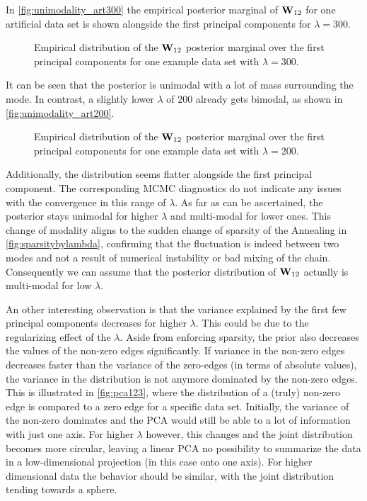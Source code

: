 In \autoref{fig:unimodality_art300}
the empirical posterior marginal of $\mathbf{W}_{12}$ for one artificial data set is shown alongside the first principal components for $\lambda=300$.
\begin{figure}[H]
	\centering
	\caption{Empirical distribution of the $\mathbf{W}_{12}$ posterior marginal over the first principal components for one example data set with $\lambda=300$.}
	
	\label{fig:unimodality_art300}
\end{figure}
It can be seen that the posterior is unimodal with a lot of mass surrounding the mode.
In contrast, a slightly lower $\lambda$ of $200$ already gets bimodal, as shown in \autoref{fig:unimodality_art200}.
\begin{figure}[H]
	\centering
	\caption{Empirical distribution of the $\mathbf{W}_{12}$ posterior marginal over the first principal components for one example data set with $\lambda=200$.}
	
	\label{fig:unimodality_art200}
\end{figure}
Additionally, the distribution seems flatter alongside the first principal component. 
The corresponding MCMC diagnostics do not indicate any issues with the convergence in this range of $\lambda$.
As far as can be ascertained, the posterior stays unimodal for higher $\lambda$ and multi-modal for lower ones.
This change of modality aligns to the sudden change of sparsity of the Annealing in \autoref{fig:sparsitybylambda},
confirming that the fluctuation is indeed between two modes and not a result of numerical instability or bad mixing of the chain.
Consequently we can assume that the posterior distribution of $\mathbf{W}_{12}$ actually is multi-modal for low $\lambda$.

An other interesting observation is that the variance explained by the first few principal components decreases for higher $\lambda$.
This could be due to the regularizing effect of the $\lambda$.
Aside from enforcing sparsity, the prior also decreases the values of the non-zero edges significantly.
If variance in the non-zero edges decreases faster than the variance of the zero-edges  (in terms of absolute values), the variance in the distribution is not anymore dominated by the non-zero edges.
This is illustrated in \autoref{fig:pca123}, where the distribution of a (truly) non-zero edge is compared to a zero edge
for a specific data set. 
Initially, the variance of the non-zero dominates and the PCA would still be able to a lot of information with just one axis. For higher $\lambda$ however, this changes and the joint distribution becomes more circular,
leaving a linear PCA no possibility to summarize the data in a low-dimensional projection (in this case onto one axis).
For higher dimensional data the behavior should be similar, with the joint distribution tending towards a sphere.

